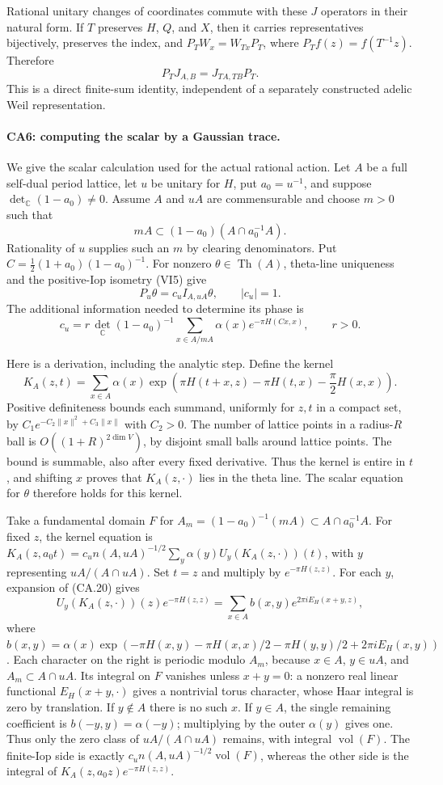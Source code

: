 Rational unitary changes of coordinates commute with these $J$
operators in their natural form. If $T$ preserves $H$, $Q$, and
$X$, then it carries representatives bijectively, preserves the
index, and
$P_TW_x=W_{Tx}P_T$, where $P_Tf(z)=f(T^{-1}z)$. Therefore
\[
 P_TJ_{A,B}=J_{TA,TB}P_T.
 \tag{CA.17}
\]
This is a direct finite-sum identity, independent of a separately
constructed adelic Weil representation.

\paragraph{CA6: computing the scalar by a Gaussian trace.}
We give the scalar calculation used for the actual rational action.
Let $A$ be a full self-dual period lattice, let $u$ be unitary for
$H$, put $a_0=u^{-1}$, and suppose $\det_{\mathbb C}(1-a_0)\ne0$.
Assume $A$ and $uA$ are commensurable and choose $m>0$ such that
\[
 mA\subset(1-a_0)(A\cap a_0^{-1}A).
 \tag{CA.18}
\]
Rationality of $u$ supplies such an $m$ by clearing denominators.
Put $C=\tfrac12(1+a_0)(1-a_0)^{-1}$. For nonzero
$\theta\in\operatorname{Th}(A)$, theta-line uniqueness and the
positive-Iop isometry (VI5) give
\[
 P_u\theta=c_u I_{A,uA}\theta,\qquad |c_u|=1.
\]
The additional information needed to determine its phase is
\[
 c_u=r\,\det_{\mathbb C}(1-a_0)^{-1}
       \sum_{x\in A/mA}\alpha(x)e^{-\pi H(Cx,x)},
 \qquad r>0.
 \tag{CA.19}
\]

Here is a derivation, including the analytic step. Define the kernel
\[
 K_A(z,t)=\sum_{x\in A}\alpha(x)
  \exp\!\left(\pi H(t+x,z)-\pi H(t,x)-\frac\pi2H(x,x)\right).
 \tag{CA.20}
\]
Positive definiteness bounds each summand, uniformly for $z,t$ in
a compact set, by $C_1e^{-C_2\|x\|^2+C_3\|x\|}$ with $C_2>0$.
The number of lattice points in a radius-$R$ ball is $O((1+R)^{2\dim V})$,
by disjoint small balls around lattice points. The bound is summable,
also after every fixed derivative. Thus the kernel is entire in $t$,
and shifting $x$ proves that $K_A(z,\cdot)$ lies in the theta line.
The scalar equation for $\theta$ therefore holds for this kernel.

Take a fundamental domain $F$ for
$A_m=(1-a_0)^{-1}(mA)\subset A\cap a_0^{-1}A$.
For fixed $z$, the kernel equation is
$K_A(z,a_0t)=c_u n(A,uA)^{-1/2}
\sum_y\alpha(y)U_y(K_A(z,\cdot))(t)$, with $y$ representing
$uA/(A\cap uA)$. Set $t=z$ and multiply by
$e^{-\pi H(z,z)}$. For each $y$, expansion of (CA.20) gives
\[
 U_y(K_A(z,\cdot))(z)e^{-\pi H(z,z)}
 =\sum_{x\in A}b(x,y)e^{2\pi iE_H(x+y,z)},
\]
where
$b(x,y)=\alpha(x)\exp(-\pi H(x,y)-\pi H(x,x)/2
-\pi H(y,y)/2+2\pi iE_H(x,y))$.
Each character on the right is periodic modulo $A_m$, because
$x\in A$, $y\in uA$, and $A_m\subset A\cap uA$.
Its integral on $F$ vanishes unless $x+y=0$: a nonzero real
linear functional $E_H(x+y,\cdot)$ gives a nontrivial torus
character, whose Haar integral is zero by translation.
If $y\notin A$ there is no such $x$. If $y\in A$, the single
remaining coefficient is $b(-y,y)=\alpha(-y)$; multiplying by
the outer $\alpha(y)$ gives one. Thus only the zero class of
$uA/(A\cap uA)$ remains, with integral $\operatorname{vol}(F)$.
The finite-Iop side is exactly
$c_u n(A,uA)^{-1/2}\operatorname{vol}(F)$, whereas the other
side is the integral of $K_A(z,a_0z)e^{-\pi H(z,z)}$.

